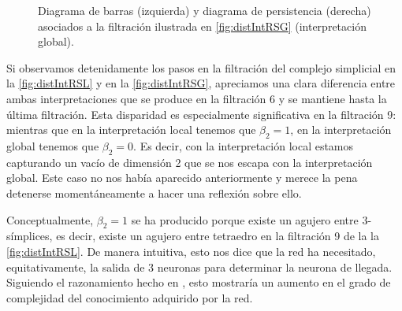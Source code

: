 \documentclass[12pt, a4paper, twoside]{book}
\numberwithin{equation}{section}
\theoremstyle{definition}
\newenvironment{ejem}
  {\pushQED{\qed}\renewcommand{\qedsymbol}{$\blacktriangleleft$}\ejemplo}
  {\popQED\endejemplo}
\theoremstyle{remark}
\theoremstyle{plain}
\begin{document}
\begin{ejem}
\begin{figure}[!htbp]
\begin{figure}[H]
			\end{figure}
		\endminipage
		\caption{Diagrama de barras (izquierda) y diagrama de 
		persistencia (derecha) asociados a la filtración ilustrada en 
		\ref{fig:distIntRSG} (interpretación global).}
		\label{fig:distIntRDG}
	\end{figure}

	Si observamos detenidamente los pasos en la filtración del complejo 
	simplicial en la \autoref{fig:distIntRSL} y en la 
	\autoref{fig:distIntRSG}, 
	apreciamos una clara diferencia entre ambas interpretaciones que se 
	produce en la filtración 6 y se mantiene hasta la última filtración. 
	Esta disparidad es especialmente significativa en la filtración 9: 
	mientras que en la interpretación local tenemos que $\beta_{2}=1$, en 
	la interpretación global tenemos que $\beta_{2}=0$. Es decir, con la 
	interpretación local estamos capturando un vacío de dimensión 2 que
	se nos escapa con la interpretación global. Este caso no nos había 
	aparecido anteriormente y merece la pena detenerse momentáneamente a 
	hacer una reflexión sobre ello.

	Conceptualmente, $\beta_{2}=1$ se ha producido porque existe un agujero
	entre $3$-símplices, es decir, existe un agujero entre tetraedro en 
	la filtración 9 de la la \autoref{fig:distIntRSL}. De manera intuitiva, 
	esto nos dice que la red ha necesitado, equitativamente, la 
	salida de 3 neuronas para determinar la neurona de llegada. Siguiendo 
	el razonamiento hecho en \cite{Articulo-Watanabe}, esto mostraría un 
	aumento en el grado de complejidad del conocimiento adquirido por la 
	red.


\end{ejem}
\end{document}
